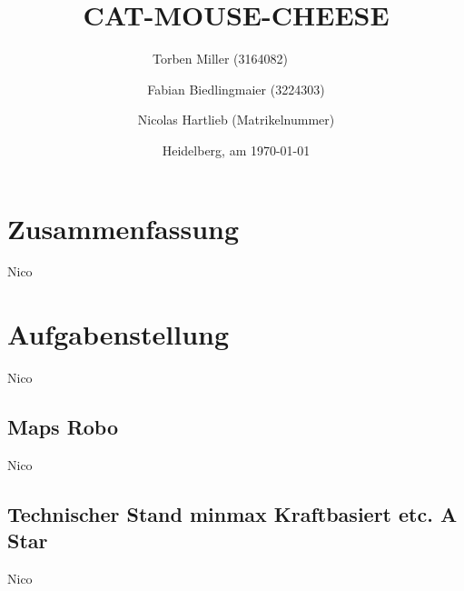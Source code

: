 \documentclass[
a4paper,     %
12pt         %
]{scrartcl}  %
\title{CAT-MOUSE-CHEESE}
\author{Torben Miller (3164082)\ \ \ \ \ \and
Fabian Biedlingmaier (3224303)        \and
Nicolas Hartlieb (Matrikelnummer)}
\date{Heidelberg, am \today{}}
\begin{document}

 \maketitle

 \newpage
 \tableofcontents

 \newpage
 \listoffigures

 \newpage
 \listoftables

 \newpage



\section*{Zusammenfassung}
Nico
\section{Aufgabenstellung}
Nico
\subsection{Maps Robo}
Nico
\subsection{Technischer Stand minmax Kraftbasiert etc. A Star}
Nico
\end{document}

